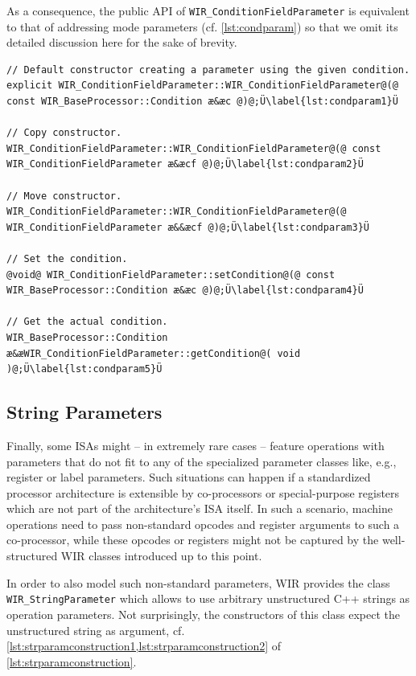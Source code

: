 As a consequence, the public \gls{API} of \texttt{WIR\_ConditionFieldParameter} is equivalent to that of addressing mode parameters (cf. \cref{lst:condparam}) so that we omit its detailed discussion here for the sake of brevity.

\begin{lstlisting}[style=code,float=ht,caption={Public Interface of Class \texttt{WIR\_ConditionFieldParameter}},label=lst:condparam]
// Default constructor creating a parameter using the given condition.
explicit WIR_ConditionFieldParameter::WIR_ConditionFieldParameter@(@ const WIR_BaseProcessor::Condition æ&æc @)@;Ü\label{lst:condparam1}Ü

// Copy constructor.
WIR_ConditionFieldParameter::WIR_ConditionFieldParameter@(@ const WIR_ConditionFieldParameter æ&æcf @)@;Ü\label{lst:condparam2}Ü

// Move constructor.
WIR_ConditionFieldParameter::WIR_ConditionFieldParameter@(@ WIR_ConditionFieldParameter æ&&æcf @)@;Ü\label{lst:condparam3}Ü

// Set the condition.
@void@ WIR_ConditionFieldParameter::setCondition@(@ const WIR_BaseProcessor::Condition æ&æc @)@;Ü\label{lst:condparam4}Ü

// Get the actual condition.
WIR_BaseProcessor::Condition æ&æWIR_ConditionFieldParameter::getCondition@( void )@;Ü\label{lst:condparam5}Ü
\end{lstlisting}


\subsection{String Parameters}
\label{ssec:strparams}

Finally, some \glspl{ISA} might -- in extremely rare cases -- feature operations with parameters that do not fit to any of the specialized parameter classes like, e.g., register or label parameters.
Such situations can happen if a standardized processor architecture is extensible by co-processors or special-purpose registers which are not part of the architecture's \gls{ISA} itself.
In such a scenario, machine operations need to pass non-standard opcodes and register arguments to such a co-processor, while these opcodes or registers might not be captured by the well-structured \gls{WIR} classes introduced up to this point.

In order to also model such non-standard parameters, \gls{WIR} provides the class \texttt{WIR\_StringParameter} which allows to use arbitrary unstructured C++ strings as operation parameters.
Not surprisingly, the constructors of this class expect the unstructured string as argument, cf. \cref{lst:strparamconstruction1,lst:strparamconstruction2} of \cref{lst:strparamconstruction}.

